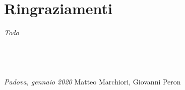 \newpage

{}
\chapter*{Ringraziamenti\label{sec:ringraziamenti}}

\noindent\textit{Todo}\\\\\\\\\\

\textit{Padova, gennaio 2020}
\hfill Matteo Marchiori, Giovanni Peron